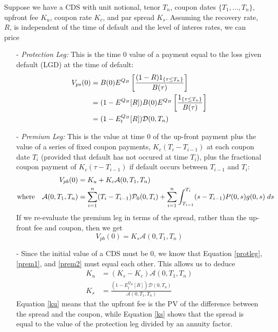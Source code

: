 \documentclass[a4paper,12pt]{scrartcl}
\begin{document}
Suppose we have a CDS with unit notional, tenor $T_n$, coupon dates
$\{ T_1, \ldots, T_n\}$, upfront fee $K_u$, coupon rate $K_c$, and
par spread $K_s$.  Assuming the recovery rate, $R$, is independent of 
the time of default and the level of interes rates, we can price 
\begin{itemize}
   \item[-] {\sl Protection Leg:} This is the time 0 value of a 
      payment equal to the loss given default (LGD) at the time of 
      default:
      \begin{align}
	 \label{protleg}
	 V_{ps}(0)&=B(0) E^{Q_B} \left[ \frac{(1-R)1_{ \{ \tau \leq T_n
	 \} }}{B(\tau)} \right] \notag\\
	 &= (1-E^{Q_B}[R]) B(0) E^{Q_B} \left[\frac{1_{\{\tau \leq T_n
	 \} }}{B(\tau)} \right]\notag\\
	 &= (1-E_t^{Q_B}[R]) \mathcal{D}(0,T_n)
      \end{align}
   \item[-] {\sl Premium Leg:} This is the value at time 0 of the 
      up-front payment plus the value of a series of fixed coupon 
      payments, $K_c(T_i-T_{i-1})$ at each coupon date $T_i$ (provided
      that default has not occured at time $T_i$), plus the fractional
      coupon payment of $K_c(\tau-T_{i-1})$ if default occurs between
      $T_{i-1}$ and $T_i$:
      \begin{align}
	 \label{prem1}
	 V_{pb}(0) &= K_u  + K_c\mathcal{A}(0,T_1,T_n) \\
	 \text{where} \quad \mathcal{A}(0,T_1,T_n) &= 
	    \sum^n_{i=1} (T_i-T_{i-1}) \mathcal{P}_0(0,T_i) +
	    \sum^n_{i=1} \int^{T_i}_{T_{i-1}} (s-T_{i-1}) P(0,s)
	    g(0,s) \; ds \notag
      \end{align}
      If we re-evaluate the premium leg in terms of the spread, rather
      than the up-front fee and coupon, then we get
      \begin{equation}
	 \label{prem2}
	 V_{pb}(0) = K_s \mathcal{A}(0,T_1,T_n) 
      \end{equation}
   \item[-] Since the initial value of a CDS must be 0, we know that
      Equation \ref{protleg}, \ref{prem1}, and \ref{prem2} must
      equal each other. This allows us to deduce 
      \begin{align}
	 K_u &= (K_s - K_c) \mathcal{A}(0,T_1,T_n) \label{ku}\\
	 K_s &= \frac{(1-E_t^{Q_B}[R]) \mathcal{D}(0,T_n)}{ 
	    \mathcal{A}(0,T_1,T_n)}\label{ks}
      \end{align}
      Equation \ref{ku} means that the upfront fee is the PV of the
      difference between the spread and the coupon, while Equation
      \ref{ks} shows that the spread is equal to the  value of the
      protection leg divided by an annuity factor.
\end{itemize}
\end{document}

